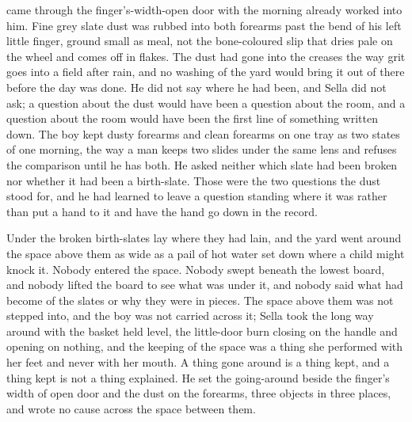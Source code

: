  came through the finger's-width-open door with the morning already worked into him. Fine grey slate dust was rubbed into both forearms past the bend of his left little finger, ground small as meal, not the bone-coloured slip that dries pale on the wheel and comes off in flakes. The dust had gone into the creases the way grit goes into a field after rain, and no washing of the yard would bring it out of there before the day was done. He did not say where he had been, and Sella did not ask; a question about the dust would have been a question about the room, and a question about the room would have been the first line of something written down. The boy kept dusty forearms and clean forearms on one tray as two states of one morning, the way a man keeps two slides under the same lens and refuses the comparison until he has both. He asked neither which slate had been broken nor whether it had been a birth-slate. Those were the two questions the dust stood for, and he had learned to leave a question standing where it was rather than put a hand to it and have the hand go down in the record.

Under  the broken birth-slates lay where they had lain, and the yard went around the space above them as wide as a pail of hot water set down where a child might knock it. Nobody entered the space. Nobody swept beneath the lowest board, and nobody lifted the board to see what was under it, and nobody said what had become of the slates or why they were in pieces. The space above them was not stepped into, and the boy was not carried across it; Sella took the long way around with the basket held level, the little-door burn closing on the handle and opening on nothing, and the keeping of the space was a thing she performed with her feet and never with her mouth. A thing gone around is a thing kept, and a thing kept is not a thing explained. He set the going-around beside the finger's width of open door and the dust on the forearms, three objects in three places, and wrote no cause across the space between them.

